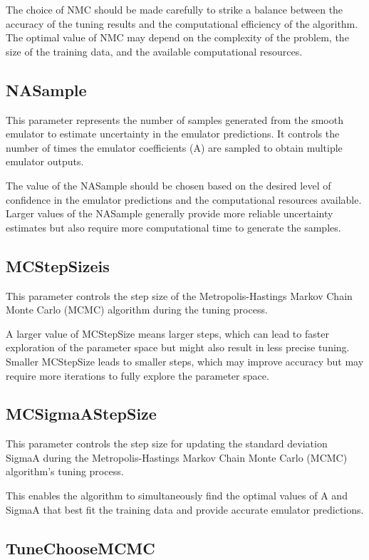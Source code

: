 \documentclass[12pt]{article}
\numberwithin{equation}{section}
\numberwithin{figure}{section}
\begin{document}
The choice of NMC should be made carefully to strike a balance between the accuracy of the tuning results and the computational efficiency of the algorithm. The optimal value of NMC may depend on the complexity of the problem, the size of the training data, and the available computational resources.  




\subsection{NASample}

This parameter represents the number of samples generated from the smooth emulator to estimate uncertainty in the emulator predictions. It controls the number of times the emulator coefficients (A) are sampled to obtain multiple emulator outputs.

The value of the NASample should be chosen based on the desired level of confidence in the emulator predictions and the computational resources available. Larger values of the NASample generally provide more reliable uncertainty estimates but also require more computational time to generate the samples.  


\subsection{MCStepSizeis}
 This parameter controls the step size of the Metropolis-Hastings Markov Chain Monte Carlo (MCMC) algorithm during the tuning process.
 
A larger value of MCStepSize means larger steps, which can lead to faster exploration of the parameter space but might also result in less precise tuning. Smaller MCStepSize leads to smaller steps, which may improve accuracy but may require more iterations to fully explore the parameter space.

\subsection{MCSigmaAStepSize}
 This parameter controls the step size for updating the standard deviation SigmaA during the Metropolis-Hastings Markov Chain Monte Carlo (MCMC) algorithm's tuning process. 

This enables the algorithm to simultaneously find the optimal values of A and SigmaA that best fit the training data and provide accurate emulator predictions.


 
\subsection{TuneChooseMCMC}
\end{document}
